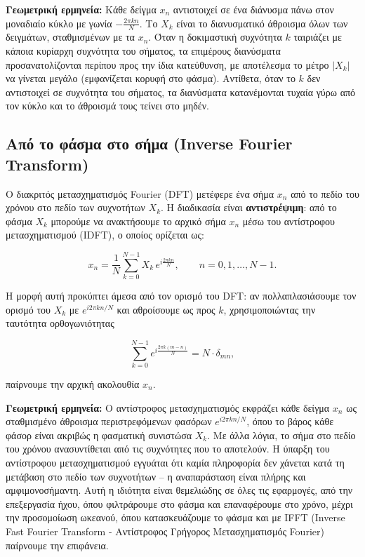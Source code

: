 \textbf{Γεωμετρική ερμηνεία:} Κάθε δείγμα \(x_n\) αντιστοιχεί σε ένα
διάνυσμα πάνω στον μοναδιαίο κύκλο με γωνία \(-\frac{2\pi kn}{N}\). Το
\(X_k\) είναι το διανυσματικό άθροισμα όλων των δειγμάτων, σταθμισμένων
με τα \(x_n\). Όταν η δοκιμαστική συχνότητα \(k\) ταιριάζει με κάποια
κυρίαρχη συχνότητα του σήματος, τα επιμέρους διανύσματα
προσανατολίζονται περίπου προς την ίδια κατεύθυνση, με αποτέλεσμα το
μέτρο \(|X_k|\) να γίνεται μεγάλο (εμφανίζεται κορυφή στο φάσμα).
Αντίθετα, όταν το \(k\) δεν αντιστοιχεί σε συχνότητα του σήματος, τα
διανύσματα κατανέμονται τυχαία γύρω από τον κύκλο και το άθροισμά τους
τείνει στο μηδέν.

\subsection{Από το φάσμα στο σήμα (Inverse Fourier
Transform)}\label{ux3b1ux3c0ux3cc-ux3c4ux3bf-ux3c6ux3acux3c3ux3bcux3b1-ux3c3ux3c4ux3bf-ux3c3ux3aeux3bcux3b1-inverse-fourier-transform}

Ο διακριτός μετασχηματισμός Fourier (DFT) μετέφερε ένα σήμα \(x_n\) από
το πεδίο του χρόνου στο πεδίο των συχνοτήτων \(X_k\). Η διαδικασία είναι
\textbf{αντιστρέψιμη}: από το φάσμα \(X_k\) μπορούμε να ανακτήσουμε το
αρχικό σήμα \(x_n\) μέσω του αντίστροφου μετασχηματισμού (IDFT), ο
οποίος ορίζεται ως:

\[
x_n = \frac{1}{N} \sum_{k=0}^{N-1} X_k \, e^{i\frac{2\pi kn}{N}}, \qquad n = 0,1,\dots,N-1.
\]

Η μορφή αυτή προκύπτει άμεσα από τον ορισμό του DFT: αν πολλαπλασιάσουμε
τον ορισμό του \(X_k\) με \(e^{i2\pi kn/N}\) και αθροίσουμε ως προς
\(k\), χρησιμοποιώντας την ταυτότητα ορθογωνιότητας

\[
\sum_{k=0}^{N-1} e^{i\frac{2\pi k(m-n)}{N}} = N \cdot \delta_{mn},
\]

παίρνουμε την αρχική ακολουθία \(x_n\).

\textbf{Γεωμετρική ερμηνεία:} Ο αντίστροφος μετασχηματισμός εκφράζει
κάθε δείγμα \(x_n\) ως σταθμισμένο άθροισμα περιστρεφόμενων φασόρων
\(e^{i2\pi kn/N}\), όπου το βάρος κάθε φάσορ είναι ακριβώς η φασματική
συνιστώσα \(X_k\). Με άλλα λόγια, το σήμα στο πεδίο του χρόνου
ανασυντίθεται από τις συχνότητες που το αποτελούν. Η ύπαρξη του
αντίστροφου μετασχηματισμού εγγυάται ότι καμία πληροφορία δεν χάνεται
κατά τη μετάβαση στο πεδίο των συχνοτήτων -- η αναπαράσταση είναι πλήρης
και αμφιμονοσήμαντη. Αυτή η ιδιότητα είναι θεμελιώδης σε όλες τις
εφαρμογές, από την επεξεργασία ήχου, όπου φιλτράρουμε στο φάσμα και
επαναφέρουμε στο χρόνο, μέχρι την προσομοίωση ωκεανού, όπου
κατασκευάζουμε το φάσμα και με IFFT (Inverse Fast Fourier Transform -
Αντίστροφος Γρήγορος Μετασχηματισμός Fourier) παίρνουμε την επιφάνεια.

